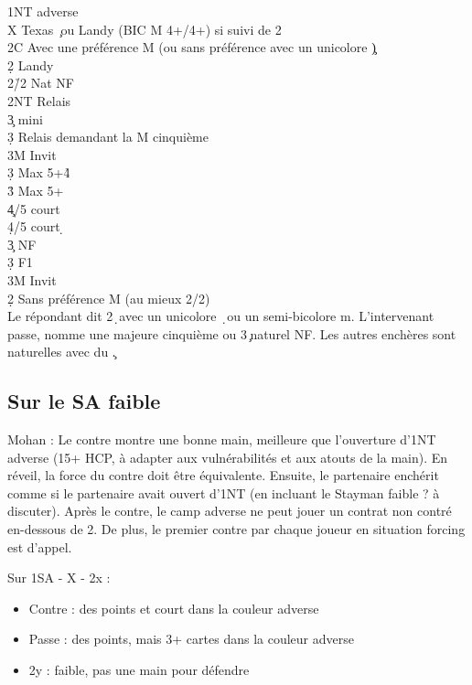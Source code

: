 \documentclass[a4paper]{article}
\begin{document}
\begin{bidtable}
1NT \> adverse\+\\
X \> Texas \c\ ou Landy (BIC M 4+/4+) si suivi de 2\d \\
\>2C Avec une préférence M (ou sans préférence avec un unicolore \c )\+\\
2\d \> Landy\+\\
2\h/2\s \> Nat NF\\
2NT \> Relais\+\\
3\c \> mini\+\\
3\d \> Relais demandant la M cinquième\\
3M \> Invit\-\\
3\d \> Max 5+\h 4\s \\
3\h \> Max 5+\h \\
4\c {}/5 court \c \\
4\d {}/5 court \d \-\\
3\c \> NF\\
3\d \> F1\\
3M \> Invit\-\\
2\d \> Sans préférence M (au mieux 2/2)\+\\
Le \> répondant dit 2\d\ avec un unicolore \d\ ou un semi-bicolore m. L'intervenant passe, nomme une majeure cinquième ou 3\c\ naturel NF. Les autres enchères sont naturelles avec du \c .\-\-\-
\end{bidtable}

\subsection{Sur le SA faible}

Mohan : Le contre montre une bonne main, meilleure que l'ouverture d'1NT adverse (15+ HCP, à adapter aux vulnérabilités et aux atouts de la main). En réveil, la force du contre doit être équivalente.
Ensuite, le partenaire enchérit comme si le partenaire avait ouvert d'1NT (en incluant le Stayman faible ? à discuter).
Après le contre, le camp adverse ne peut jouer un contrat non contré en-dessous de 2\s . De plus, le premier contre par chaque joueur en situation forcing est d'appel.

Sur 1SA - X - 2x :

\begin{itemize}
\item Contre : des points et court dans la couleur adverse

\item Passe : des points, mais 3+ cartes dans la couleur adverse

\item 2y : faible, pas une main pour défendre

\end{itemize}
\end{document}
